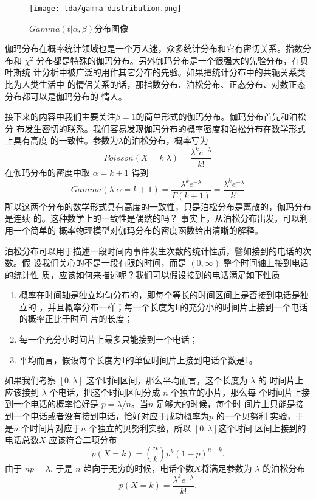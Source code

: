 \begin{figure}[htbp]
\centering
\texttt{[image: lda/gamma-distribution.png]}
\caption{$Gamma(t|\alpha,\beta)$分布图像}
\end{figure}

伽玛分布在概率统计领域也是一个万人迷，众多统计分布和它有密切关系。指数分布和
$\chi^2$ 分布都是特殊的伽玛分布。另外伽玛分布是一个很强大的先验分布，在贝叶斯统
计分析中被广泛的用作其它分布的先验。如果把统计分布中的共轭关系类比为人类生活中
的情侣关系的话，那指数分布、泊松分布、正态分布、对数正态分布都可以是伽玛分布的
情人。

接下来的内容中我们主要关注$\beta = 1$的简单形式的伽玛分布。伽玛分布首先和泊松分
布发生密切的联系。我们容易发现伽玛分布的概率密度和泊松分布在数学形式上具有高度
的一致性。参数为$\lambda$的泊松分布，概率写为
$$Poisson(X=k|\lambda) = \frac{\lambda^k e^{-\lambda}}{k!} $$
在伽玛分布的密度中取 $\alpha = k+1$ 得到
$$ Gamma(\lambda|\alpha=k+1) 
= \frac{\lambda^ke^{-\lambda}}{\Gamma(k+1)}= \frac{\lambda^k e^{-\lambda}}{k!} $$
所以这两个分布的数学形式具有高度的一致性，只是泊松分布是离散的，伽玛分布是连续
的。这种数学上的一致性是偶然的吗？ 事实上，从泊松分布出发，可以利用一个简单的
概率物理模型对伽玛分布的密度函数给出清晰的解释。

泊松分布可以用于描述一段时间内事件发生次数的统计性质，譬如接到的电话的次数。假
设我们关心的不是一段有限的时间，而是 $(0, \infty)$ 整个时间轴上接到电话的统计性
质，应该如何来描述呢？我们可以假设接到的电话满足如下性质
\begin{enumerate}
\item 概率在时间轴是独立均匀分布的，即每个等长的时间区间上是否接到电话是独立的
，并且概率分布一样；每一个长度为h的充分小的时间片上接到一个电话的概率正比于时间
片的长度；
\item 每一个充分小时间片上最多只能接到一个电话；
\item 平均而言，假设每个长度为1的单位时间片上接到电话个数是1。
\end{enumerate}
如果我们考察 $[0, \lambda]$ 这个时间区间，那么平均而言，这个长度为 $\lambda$ 的
时间片上应该接到 $\lambda$ 个电话，把这个时间区间分成 $n$ 个独立的小片，那么每
个时间片上接到一个电话的概率恰好是 $p = \lambda/n$。当$n$ 足够大的时候，每个时
间片上只能是接到一个电话或者没有接到电话，恰好对应于成功概率为$p$ 的一个贝努利
实验，于是$n$ 个时间片对应于$n$ 个独立的贝努利实验，所以 $[0, \lambda]$这个时间
区间上接到的电话总数$X$ 应该符合二项分布
$$p(X=k) = \binom{n}{k} p^k(1-p)^{n-k} .$$
由于 $np= \lambda$, 于是 $n$ 趋向于无穷的时候，电话个数$X$将满足参数为
$\lambda$ 的泊松分布
$$p(X=k) = \frac{\lambda^k e^{-\lambda}}{k!} .$$

